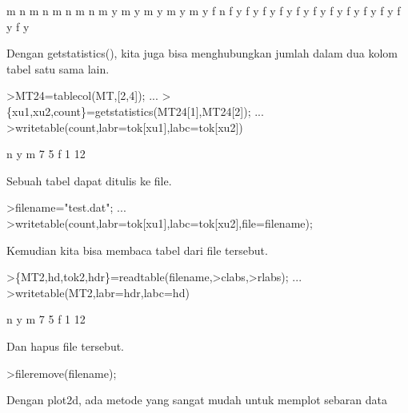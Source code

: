 \documentclass[a4paper,10pt]{article}
\begin{document}
\begin{eulernotebook}
\begin{eulercomment}
\begin{eulercomment}
\begin{euleroutput}
           m         n
           m         n
           m         n
           m         n
           m         y
           m         y
           m         y
           m         y
           m         y
           f         n
           f         y
           f         y
           f         y
           f         y
           f         y
           f         y
           f         y
           f         y
           f         y
           f         y
           f         y
           f         y
\end{euleroutput}
\begin{eulercomment}
Dengan getstatistics(), kita juga bisa menghubungkan jumlah dalam dua
kolom tabel satu sama lain.
\end{eulercomment}
\begin{eulerprompt}
>MT24=tablecol(MT,[2,4]); ...
>\{xu1,xu2,count\}=getstatistics(MT24[1],MT24[2]); ...
>writetable(count,labr=tok[xu1],labc=tok[xu2])
\end{eulerprompt}
\begin{euleroutput}
                     n         y
           m         7         5
           f         1        12
\end{euleroutput}
\begin{eulercomment}
Sebuah tabel dapat ditulis ke file.
\end{eulercomment}
\begin{eulerprompt}
>filename="test.dat"; ...
>writetable(count,labr=tok[xu1],labc=tok[xu2],file=filename);
\end{eulerprompt}
\begin{eulercomment}
Kemudian kita bisa membaca tabel dari file tersebut.
\end{eulercomment}
\begin{eulerprompt}
>\{MT2,hd,tok2,hdr\}=readtable(filename,>clabs,>rlabs); ...
>writetable(MT2,labr=hdr,labc=hd)
\end{eulerprompt}
\begin{euleroutput}
                     n         y
           m         7         5
           f         1        12
\end{euleroutput}
\begin{eulercomment}
Dan hapus file tersebut.
\end{eulercomment}
\begin{eulerprompt}
>fileremove(filename);
\end{eulerprompt}
\begin{eulercomment}
Dengan plot2d, ada metode yang sangat mudah untuk memplot sebaran data

\end{eulercomment}
\end{eulercomment}
\end{eulercomment}
\end{eulernotebook}
\end{document}
